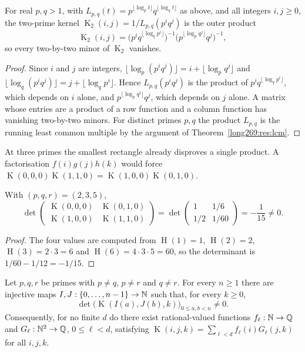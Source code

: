 \documentclass[11pt]{article}
\theoremstyle{remark}
\theoremstyle{plain}
\newcommand{\hgt}{\operatorname{H}}
\newcommand{\Kernel}{\operatorname{K}}
\begin{document}
\begin{proposition}\label{long269:res:two-prime-rank}
For real $p,q>1$, with $L_{p,q}(t)=p^{\lfloor\log_p t\rfloor}q^{\lfloor\log_q t\rfloor}$
as above, and all integers $i,j\ge0$, the two-prime kernel
$\Kernel_2(i,j)=1/L_{p,q}(p^iq^j)$ is the outer product
\[
 \Kernel_2(i,j)
 =\bigl(p^{i}q^{\lfloor\log_q p^{i}\rfloor}\bigr)^{-1}
  \bigl(p^{\lfloor\log_p q^{j}\rfloor}q^{j}\bigr)^{-1},
\]
so every two-by-two minor of $\Kernel_2$ vanishes.
\end{proposition}

\begin{proof}
Since $i$ and $j$ are integers,
$\lfloor\log_p(p^iq^j)\rfloor=i+\lfloor\log_p q^{j}\rfloor$ and
$\lfloor\log_q(p^iq^j)\rfloor=j+\lfloor\log_q p^{i}\rfloor$.  Hence
$L_{p,q}(p^iq^j)$ is the product of $p^{i}q^{\lfloor\log_q p^{i}\rfloor}$,
which depends on $i$ alone, and $p^{\lfloor\log_p q^{j}\rfloor}q^{j}$, which
depends on $j$ alone.  A matrix whose entries are a product of a row function
and a column function has vanishing two-by-two minors.  For distinct primes
$p,q$ the product $L_{p,q}$ is the running least common multiple by the
argument of Theorem~\ref{long269:res:lcm}.
\end{proof}


At three primes the smallest rectangle already disproves a single
product. A factorisation $f(i)g(j)h(k)$ would force
$\Kernel(0,0,0)\Kernel(1,1,0)=\Kernel(1,0,0)\Kernel(0,1,0)$.

\begin{proposition}\label{long269:res:rank}
With $(p,q,r)=(2,3,5)$,
\[
 \det\begin{pmatrix}
 \Kernel(0,0,0)&\Kernel(0,1,0)\\
 \Kernel(1,0,0)&\Kernel(1,1,0)
 \end{pmatrix}
 =\det\begin{pmatrix}1&1/6\\1/2&1/60\end{pmatrix}
 =-\frac1{15}\ne0 .
\]
\end{proposition}

\begin{proof}
The four values are computed from $\hgt(1)=1$, $\hgt(2)=2$,
$\hgt(3)=2\cdot3=6$ and $\hgt(6)=4\cdot3\cdot5=60$, so the determinant is
$1/60-1/12=-1/15$.
\end{proof}


\begin{theorem}\label{long269:res:infinite-rank}
\label{long269:res:lead-infinite-rank}
Let $p,q,r$ be primes with $p\ne q$, $p\ne r$ and $q\ne r$.  For every
$n\ge1$ there are injective maps $I,J:\{0,\ldots,n-1\}\to\mathbb{N}$ such that, for
every $k\ge0$,
\[
 \det\bigl(\Kernel(I(a),J(b),k)\bigr)_{0\le a,b<n}\ne0 .
\]
Consequently, for no finite $d$ do there exist rational-valued functions
$f_\ell:\mathbb{N}\to\mathbb{Q}$ and $G_\ell:\mathbb{N}^{2}\to\mathbb{Q}$, $0\le\ell<d$, satisfying
$\Kernel(i,j,k)=\sum_{\ell<d}f_\ell(i)G_\ell(j,k)$ for all $i,j,k$.
\end{theorem}
\end{document}
